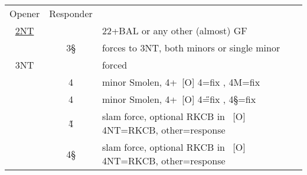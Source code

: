 \hypertarget{2n3s3n}{}
\begin{longtable}{C{\bidlength} C{\bidlength} | l}
Opener & Responder \\
\hyperlink{2n}{2NT} & & 22+BAL or any other (almost) GF \\
& 3\S & forces to 3NT, both minors or single minor \\
3NT & & forced \\
\hline\hline
& 4\C & minor Smolen, 4+\D\ [O] 4\D=fix \D, 4M=fix \C \\
& 4\D & minor Smolen, 4+\C\ [O] 4\H=fix \C, 4\S=fix \D \\
& 4\H & slam force, optional RKCB in \C\ [O] 4NT=RKCB, other=response \\
& 4\S & slam force, optional RKCB in \D\ [O] 4NT=RKCB, other=response \\
\end{longtable}
